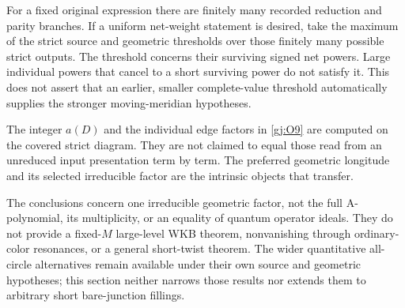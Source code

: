 For a fixed original expression there are finitely many recorded
reduction and parity branches. If a uniform net-weight statement is
desired, take the maximum of the strict source and geometric
thresholds over those finitely many possible strict outputs. The
threshold concerns their surviving signed net powers. Large
individual powers that cancel to a short surviving power do not
satisfy it. This does not assert that an earlier, smaller
complete-value threshold automatically supplies the stronger
moving-meridian hypotheses.

The integer \(a(D)\) and the individual edge factors in \eqref{gj:O9} are
computed on the covered strict diagram. They are not claimed to
equal those read from an unreduced input presentation term by term.
The preferred geometric longitude and its selected irreducible
factor are the intrinsic objects that transfer.

The conclusions concern one irreducible geometric factor, not the
full A-polynomial, its multiplicity, or an equality of quantum
operator ideals. They do not provide a fixed-\(M\) large-level WKB
theorem, nonvanishing through ordinary-color resonances, or a
general short-twist theorem. The wider quantitative all-circle
alternatives remain available under their own source and geometric
hypotheses; this section neither narrows those results nor extends
them to arbitrary short bare-junction fillings.
